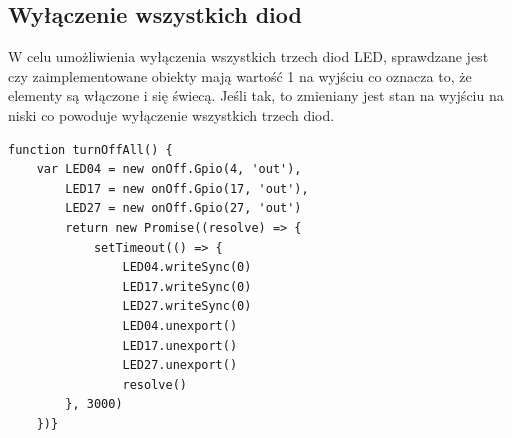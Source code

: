 \subsection{Wyłączenie wszystkich diod}
W celu umożliwienia wyłączenia wszystkich trzech diod LED, sprawdzane jest czy zaimplementowane obiekty mają wartość 1 na wyjściu co oznacza to, że elementy są włączone i się świecą. Jeśli tak, to zmieniany jest stan na wyjściu na niski co powoduje wyłączenie wszystkich trzech diod. 
\begin{lstlisting}[caption=Implementacja funkcji wyłączająca wszystkie diody]
function turnOffAll() {
    var LED04 = new onOff.Gpio(4, 'out'),
        LED17 = new onOff.Gpio(17, 'out'),
        LED27 = new onOff.Gpio(27, 'out')
        return new Promise((resolve) => {
        	setTimeout(() => {
	            LED04.writeSync(0)
	            LED17.writeSync(0)
	            LED27.writeSync(0)
	            LED04.unexport()
	            LED17.unexport()
	            LED27.unexport()
	            resolve()
        }, 3000)
    })}
\end{lstlisting}

